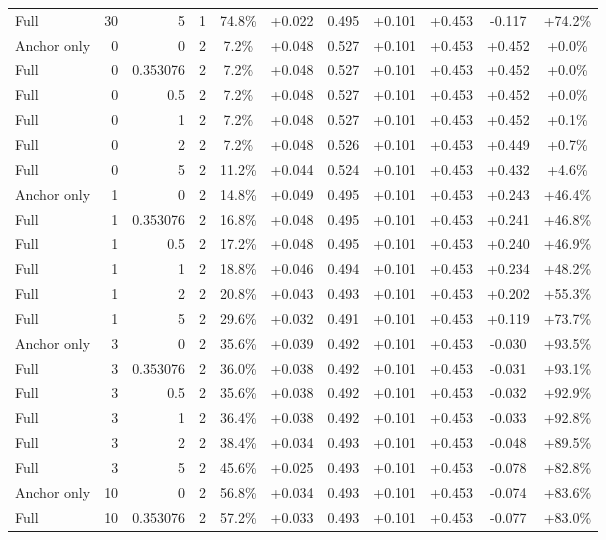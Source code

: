 \begin{table}[htbp]
\begin{tabular}{lrrrccccccc}
Full & 30 & 5 & 1 & 74.8\% & +0.022 & 0.495 & +0.101 & +0.453 & -0.117 & +74.2\% \\
Anchor only & 0 & 0 & 2 & 7.2\% & +0.048 & 0.527 & +0.101 & +0.453 & +0.452 & +0.0\% \\
Full & 0 & 0.353076 & 2 & 7.2\% & +0.048 & 0.527 & +0.101 & +0.453 & +0.452 & +0.0\% \\
Full & 0 & 0.5 & 2 & 7.2\% & +0.048 & 0.527 & +0.101 & +0.453 & +0.452 & +0.0\% \\
Full & 0 & 1 & 2 & 7.2\% & +0.048 & 0.527 & +0.101 & +0.453 & +0.452 & +0.1\% \\
Full & 0 & 2 & 2 & 7.2\% & +0.048 & 0.526 & +0.101 & +0.453 & +0.449 & +0.7\% \\
Full & 0 & 5 & 2 & 11.2\% & +0.044 & 0.524 & +0.101 & +0.453 & +0.432 & +4.6\% \\
Anchor only & 1 & 0 & 2 & 14.8\% & +0.049 & 0.495 & +0.101 & +0.453 & +0.243 & +46.4\% \\
Full & 1 & 0.353076 & 2 & 16.8\% & +0.048 & 0.495 & +0.101 & +0.453 & +0.241 & +46.8\% \\
Full & 1 & 0.5 & 2 & 17.2\% & +0.048 & 0.495 & +0.101 & +0.453 & +0.240 & +46.9\% \\
Full & 1 & 1 & 2 & 18.8\% & +0.046 & 0.494 & +0.101 & +0.453 & +0.234 & +48.2\% \\
Full & 1 & 2 & 2 & 20.8\% & +0.043 & 0.493 & +0.101 & +0.453 & +0.202 & +55.3\% \\
Full & 1 & 5 & 2 & 29.6\% & +0.032 & 0.491 & +0.101 & +0.453 & +0.119 & +73.7\% \\
Anchor only & 3 & 0 & 2 & 35.6\% & +0.039 & 0.492 & +0.101 & +0.453 & -0.030 & +93.5\% \\
Full & 3 & 0.353076 & 2 & 36.0\% & +0.038 & 0.492 & +0.101 & +0.453 & -0.031 & +93.1\% \\
Full & 3 & 0.5 & 2 & 35.6\% & +0.038 & 0.492 & +0.101 & +0.453 & -0.032 & +92.9\% \\
Full & 3 & 1 & 2 & 36.4\% & +0.038 & 0.492 & +0.101 & +0.453 & -0.033 & +92.8\% \\
Full & 3 & 2 & 2 & 38.4\% & +0.034 & 0.493 & +0.101 & +0.453 & -0.048 & +89.5\% \\
Full & 3 & 5 & 2 & 45.6\% & +0.025 & 0.493 & +0.101 & +0.453 & -0.078 & +82.8\% \\
Anchor only & 10 & 0 & 2 & 56.8\% & +0.034 & 0.493 & +0.101 & +0.453 & -0.074 & +83.6\% \\
Full & 10 & 0.353076 & 2 & 57.2\% & +0.033 & 0.493 & +0.101 & +0.453 & -0.077 & +83.0\% \\

\end{tabular}
\end{table}

